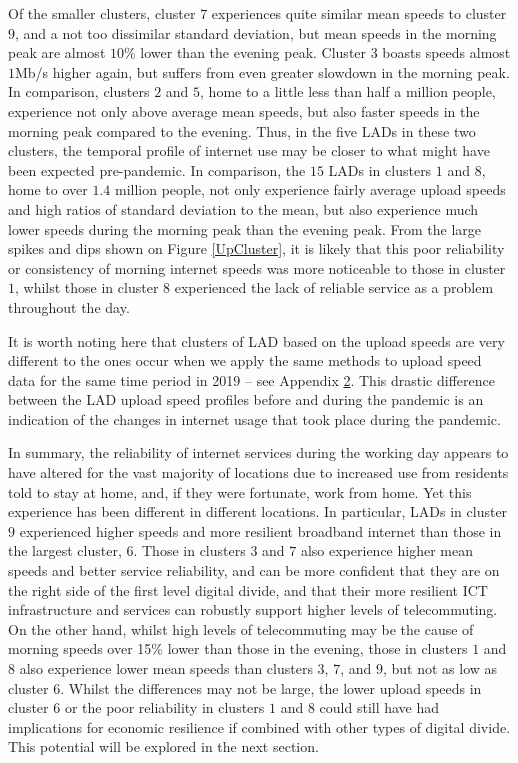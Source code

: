 \documentclass[]{interact}
\theoremstyle{plain}%
\theoremstyle{definition}
\theoremstyle{remark}
\begin{document}
Of the smaller clusters, cluster \(7\) experiences quite similar mean
speeds to cluster \(9\), and a not too dissimilar standard deviation,
but mean speeds in the morning peak are almost \(10\)\% lower than the
evening peak. Cluster \(3\) boasts speeds almost \(1\)Mb/s higher again,
but suffers from even greater slowdown in the morning peak. In
comparison, clusters \(2\) and \(5\), home to a little less than half a
million people, experience not only above average mean speeds, but also
faster speeds in the morning peak compared to the evening. Thus, in the
five LADs in these two clusters, the temporal profile of internet use
may be closer to what might have been expected pre-pandemic. In
comparison, the \(15\) LADs in clusters \(1\) and \(8\), home to over
\(1.4\) million people, not only experience fairly average upload speeds
and high ratios of standard deviation to the mean, but also experience
much lower speeds during the morning peak than the evening peak. From
the large spikes and dips shown on Figure \ref{UpCluster}, it is likely
that this poor reliability or consistency of morning internet speeds was
more noticeable to those in cluster \(1\), whilst those in cluster \(8\)
experienced the lack of reliable service as a problem throughout the
day.

It is worth noting here that clusters of LAD based on the upload speeds
are very different to the ones occur when we apply the same methods to
upload speed data for the same time period in 2019 -- see Appendix
\protect\hyperlink{appendix2}{2}. This drastic difference between the
LAD upload speed profiles before and during the pandemic is an
indication of the changes in internet usage that took place during the
pandemic.

In summary, the reliability of internet services during the working day
appears to have altered for the vast majority of locations due to
increased use from residents told to stay at home, and, if they were
fortunate, work from home. Yet this experience has been different in
different locations. In particular, LADs in cluster \(9\) experienced
higher speeds and more resilient broadband internet than those in the
largest cluster, \(6\). Those in clusters \(3\) and \(7\) also
experience higher mean speeds and better service reliability, and can be
more confident that they are on the right side of the first level
digital divide, and that their more resilient ICT infrastructure and
services can robustly support higher levels of telecommuting. On the
other hand, whilst high levels of telecommuting may be the cause of
morning speeds over 15\% lower than those in the evening, those in
clusters \(1\) and \(8\) also experience lower mean speeds than clusters
\(3\), \(7\), and \(9\), but not as low as cluster \(6\). Whilst the
differences may not be large, the lower upload speeds in cluster \(6\)
or the poor reliability in clusters \(1\) and \(8\) could still have had
implications for economic resilience if combined with other types of
digital divide. This potential will be explored in the next section.
\end{document}
